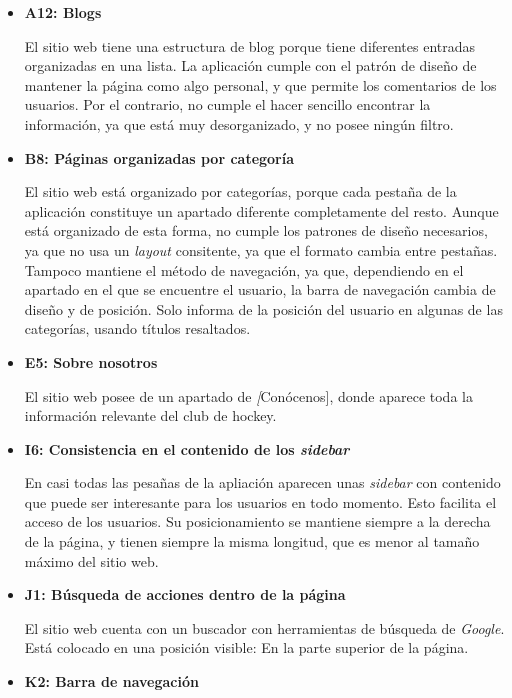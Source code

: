 \documentclass[10pt, spanish, pdftex]{template/UC3M_document}
\begin{document}
  \begin{itemize}
    \item \textbf{A12: Blogs}

    El sitio web tiene una estructura de blog porque tiene diferentes entradas organizadas en una lista.
    La aplicación cumple con el patrón de diseño de mantener la página como algo personal, y que permite los comentarios de los usuarios.
    Por el contrario, no cumple el hacer sencillo encontrar la información, ya que está muy desorganizado, y no posee ningún filtro.

    \item \textbf{B8: Páginas organizadas por categoría}

    El sitio web está organizado por categorías, porque cada pestaña de la aplicación constituye un apartado diferente completamente del resto.
    Aunque está organizado de esta forma, no cumple los patrones de diseño necesarios, ya que no usa un \textit{layout} consitente, ya que el formato cambia entre pestañas. Tampoco mantiene el método de navegación, ya que, dependiendo en el apartado en el que se encuentre el usuario, la barra de navegación cambia de diseño y de posición. Solo informa de la posición del usuario en algunas de las categorías, usando títulos resaltados.

    \item \textbf{E5: Sobre nosotros}

    El sitio web posee de un apartado de \textit[Conócenos], donde aparece toda la información relevante del club de hockey.

    \item \textbf{I6: Consistencia en el contenido de los \textit{sidebar}}

    En casi todas las pesañas de la apliación aparecen unas \textit{sidebar} con contenido que puede ser interesante para los usuarios en todo momento. Esto facilita el acceso de los usuarios. Su posicionamiento se mantiene siempre a la derecha de la página, y tienen siempre la misma longitud, que es menor al tamaño máximo del sitio web.

    \item \textbf{J1: Búsqueda de acciones dentro de la página}

    El sitio web cuenta con un buscador con herramientas de búsqueda de \textit{Google}. Está colocado en una posición visible: En la parte superior de la página.

    \item \textbf{K2: Barra de navegación}

  \end{itemize}
\end{document}
